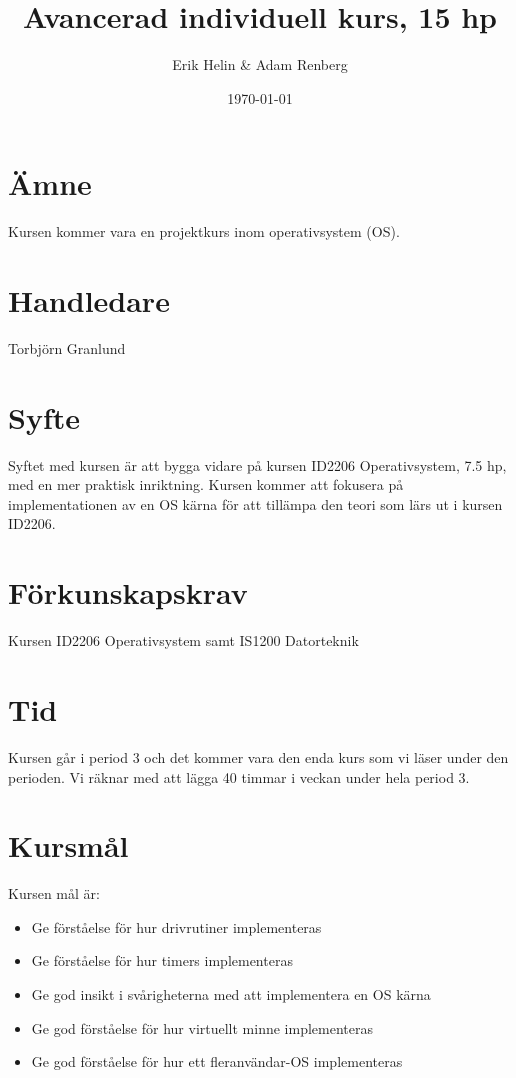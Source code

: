 \documentclass[11pt,oneside,a4paper]{article}
\begin{document}
\title{Avancerad individuell kurs, 15 hp}
\author{Erik Helin \& Adam Renberg}
\date{\today}
\maketitle

\section{Ämne}
Kursen kommer vara en projektkurs inom operativsystem (OS).

\section{Handledare}
Torbjörn Granlund

\section{Syfte}
Syftet med kursen är att bygga vidare på kursen ID2206 Operativsystem, 
7.5 hp, med en mer praktisk inriktning. Kursen kommer att fokusera 
på implementationen av en OS kärna för att tillämpa den teori som lärs 
ut i kursen ID2206.

\section{Förkunskapskrav}
Kursen ID2206 Operativsystem samt IS1200 Datorteknik

\section{Tid}
Kursen går i period 3 och det kommer vara den enda kurs som vi läser under
den perioden. Vi räknar med att lägga 40 timmar i veckan under hela period 3.

\section{Kursmål}
Kursen mål är:
\begin{itemize}
    \item Ge förståelse för hur drivrutiner implementeras
    \item Ge förståelse för hur timers implementeras
    \item Ge god insikt i svårigheterna med att implementera en OS kärna
    \item Ge god förståelse för hur virtuellt minne implementeras
    \item Ge god förståelse för hur ett fleranvändar-OS implementeras
\end{itemize}
\end{document}
